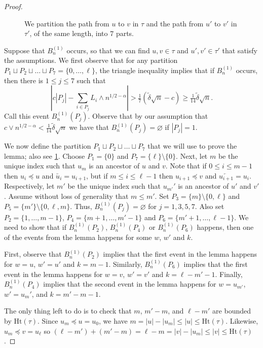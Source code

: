 \documentclass[11pt,reqno]{amsart}
\newcommand{\Ht}{\mathrm{Ht}}
\renewcommand{\emptyset}{\varnothing}
\begin{document}
\begin{proof}
\begin{figure}

\caption{We partition the path from $u$ to $v$ in $\tau$ and the path from $u'$ to $v'$ in $\tau'$, of the same length, into $7$ parts.}
\label{fig:partition}
\end{figure}
    Suppose that $B_n^{(1)}$ occurs, so that we can find $u,v\in \tau$ and $u',v'\in \tau'$ that satisfy the assumptions. We first observe that for any partition $P_1 \sqcup P_2 \sqcup \dots  \sqcup P_7=\{0,\dots, \ell\}$, the triangle inequality implies that if $B_n^{(1)}$ occurs, then there is $1\le j \le 7$ such that 
    \[\left| c|P_j|-\sum_{i\in P_j} L_i\wedge n^{1/2-\alpha}\right|> \tfrac{1}{7}(\tilde\delta \sqrt{n}-c)\geq \tfrac{1}{14}\tilde\delta \sqrt{n}. \]
    Call this event $B_n^{(1)}(P_j)$.  Observe that by our assumption that $c\vee n^{1/2-\alpha}<\tfrac{1}{14}\tilde\delta \sqrt{n}$ we have that $B_n^{(1)}(P_j)=\emptyset$ if $|P_j|=1$.  

    We now define the partition $P_1 \sqcup P_2 \sqcup \dots  \sqcup P_7$ that we will use to prove the lemma; also see \cref{fig:partition}. Choose $P_1=\{0\}$ and $P_7=\{\ell\}\setminus\{0\}$. Next, let $m$ be the unique index such that $u_m$ is an ancestor of $u$ and $v$. %
    Note that if $0\leq i\leq m-1$ then $u_i\preceq u$ and $\overleftarrow{u_i}=u_{i+1}$, but if $m\leq i\leq \ell-1$ then $u_{i+1}\preceq v$ and $\overleftarrow{u_{i+1}}=u_i$. Respectively, let $m'$ be the unique index such that $u_{m'}'$ is an ancestor of $u'$ and $v'$. 
    Assume without loss of generality that $m\le m'$. Set $P_3=\{m\}\setminus\{0,\ell\}$ and $P_5=\{m'\}\setminus\{0,\ell, m\}$.  Thus, $B_n^{(1)}(P_j)=\emptyset$ for $j=1,3,5,7$. Also set $P_2=\{1,\dots, m-1\}$, $P_4=\{m+1,\dots, m'-1\}$ and $P_6=\{m'+1, \dots, \ell-1\}$. We need to show that if $B_n^{(1)}(P_2)$, $B_n^{(1)}(P_4)$ or $B_n^{(1)}(P_6)$ happens, then one of the events from the lemma happens for some $w$, $w'$ and $k$. 
    
    First, observe that $B_n^{(1)}(P_2)$ implies that the first event in the lemma happens for $w=u$, $w'=u'$ and $k=m-1$. Similarly, $B_n^{(1)}(P_6)$ implies that the first event in the lemma happens for $w=v$, $w'=v'$ and $k=\ell-m'-1$. Finally, $B_n^{(1)}(P_4)$ implies that the second event in the lemma happens for $w=u_{m'}$, $w'=u_{m}'$, and $k=m'-m-1$.
    
    The only thing left to do is to check that $m$, $m'-m$, and $\ell-m'$ are bounded by $\Ht(\tau)$. Since $u_m\preceq u=u_0$, we have $m=|u|-|u_m|\leq |u|\leq \Ht(\tau)$. Likewise, $u_m\preceq v=u_\ell$ so $(\ell-m')+(m'-m)=\ell-m=|v|-|u_m|\leq |v|\leq \Ht(\tau)$.
\end{proof}
\end{document}
